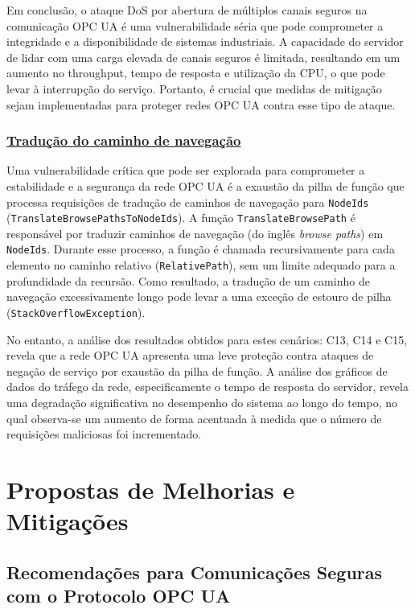 Em conclusão, o ataque DoS por abertura de múltiplos canais seguros na comunicação OPC UA é uma vulnerabilidade séria que pode comprometer a integridade e a disponibilidade de sistemas industriais. A capacidade do servidor de lidar com uma carga elevada de canais seguros é limitada, resultando em um aumento no throughput, tempo de resposta e utilização da CPU, o que pode levar à interrupção do serviço. Portanto, é crucial que medidas de mitigação sejam implementadas para proteger redes OPC UA contra esse tipo de ataque.

\subsubsection*{\underline{Tradução do caminho de navegação}}

Uma vulnerabilidade crítica que pode ser explorada para comprometer a estabilidade e a segurança da rede OPC UA é a exaustão da pilha de função que processa requisições de tradução de caminhos de navegação para \texttt{NodeIds} (\texttt{TranslateBrowsePathsToNodeIds}). A função \texttt{TranslateBrowsePath} é responsável por traduzir caminhos de navegação (do inglês \textit{browse paths}) em \texttt{NodeIds}. Durante esse processo, a função é chamada recursivamente para cada elemento no caminho relativo (\texttt{RelativePath}), sem um limite adequado para a profundidade da recursão. Como resultado, a tradução de um caminho de navegação excessivamente longo pode levar a uma exceção de estouro de pilha (\texttt{StackOverflowException}).

No entanto, a análise dos resultados obtidos para estes cenários: C13, C14 e C15, revela que a rede OPC UA apresenta uma leve proteção contra ataques de negação de serviço por exaustão da pilha de função. A análise dos gráficos de dados do tráfego da rede, especificamente o tempo de resposta do servidor, revela uma degradação significativa no desempenho do sistema ao longo do tempo, no qual observa-se um aumento de forma acentuada à medida que o número de requisições maliciosas foi incrementado.


\section{Propostas de Melhorias e Mitigações} \label{sec:melhorias-mitigacoes}

\subsection{Recomendações para Comunicações Seguras com o Protocolo OPC UA}

